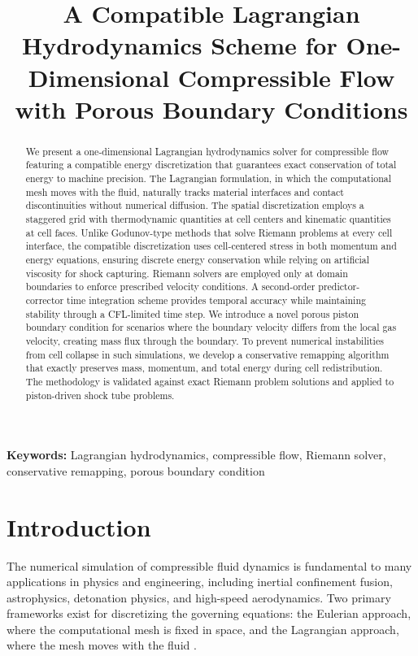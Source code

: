 \documentclass[12pt,a4paper]{article}
\title{\textbf{A Compatible Lagrangian Hydrodynamics Scheme for One-Dimensional Compressible Flow with Porous Boundary Conditions}}
\author{}
\date{}
\begin{document}
\maketitle

\begin{abstract}
We present a one-dimensional Lagrangian hydrodynamics solver for compressible flow featuring a compatible energy discretization that guarantees exact conservation of total energy to machine precision. The Lagrangian formulation, in which the computational mesh moves with the fluid, naturally tracks material interfaces and contact discontinuities without numerical diffusion. The spatial discretization employs a staggered grid with thermodynamic quantities at cell centers and kinematic quantities at cell faces. Unlike Godunov-type methods that solve Riemann problems at every cell interface, the compatible discretization uses cell-centered stress in both momentum and energy equations, ensuring discrete energy conservation while relying on artificial viscosity for shock capturing. Riemann solvers are employed only at domain boundaries to enforce prescribed velocity conditions. A second-order predictor-corrector time integration scheme provides temporal accuracy while maintaining stability through a CFL-limited time step. We introduce a novel porous piston boundary condition for scenarios where the boundary velocity differs from the local gas velocity, creating mass flux through the boundary. To prevent numerical instabilities from cell collapse in such simulations, we develop a conservative remapping algorithm that exactly preserves mass, momentum, and total energy during cell redistribution. The methodology is validated against exact Riemann problem solutions and applied to piston-driven shock tube problems.
\end{abstract}

\textbf{Keywords:} Lagrangian hydrodynamics, compressible flow, Riemann solver, conservative remapping, porous boundary condition

\section{Introduction}
\label{sec:introduction}

The numerical simulation of compressible fluid dynamics is fundamental to many applications in physics and engineering, including inertial confinement fusion, astrophysics, detonation physics, and high-speed aerodynamics. Two primary frameworks exist for discretizing the governing equations: the Eulerian approach, where the computational mesh is fixed in space, and the Lagrangian approach, where the mesh moves with the fluid \citep{Benson1992}.
\end{document}
